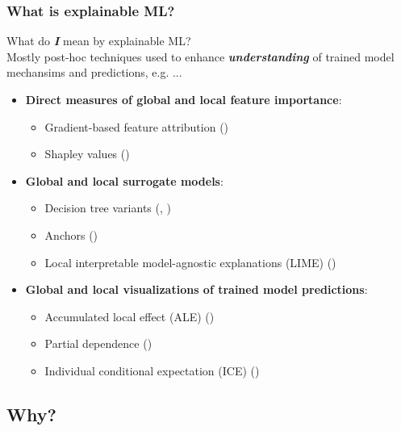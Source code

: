 \documentclass[11pt,
               aspectratio=169,
               hyperref={colorlinks}
               ]{beamer}
\begin{document}
	\begin{frame}
	
		\frametitle{What is explainable ML?}

		What do \textit{\textbf{I}} mean by explainable ML?\\
		\vspace{5pt}
		Mostly post-hoc techniques used to enhance \textit{\textbf{understanding}} of trained model mechansims and predictions, e.g. ...
		\begin{itemize}
			\item \textbf{Direct measures of global and local feature importance}: 
			\begin{itemize}\footnotesize
				\item Gradient-based feature attribution (\citet{grad_attr})
				\item Shapley values (\citet{shapley})
			\end{itemize}
			\item \textbf{Global and local surrogate models}: 
			\begin{itemize}\footnotesize
				\item Decision tree variants (\citet{viper}, \citet{dt_surrogate1})
				\item Anchors (\citet{anchors})
				\item Local interpretable model-agnostic explanations (LIME) (\citet{lime})
			\end{itemize}
			\item \textbf{Global and local visualizations of trained model predictions}: 
			\begin{itemize}\footnotesize
				\item Accumulated local effect (ALE) (\citet{ale_plot}) 
				\item Partial dependence (\citet{esl})
				\item Individual conditional expectation (ICE) (\citet{ice_plots})
			\end{itemize}
		\end{itemize}\normalsize
			
	\end{frame}
	
	\subsection{Why?}
\end{document}
